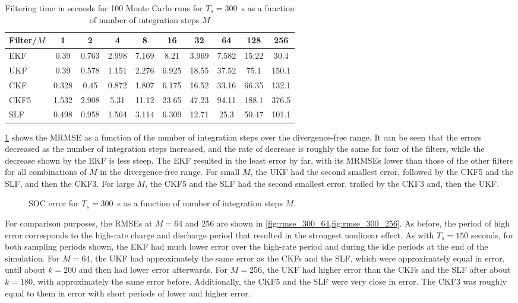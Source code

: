 \documentclass[../zhang_thesis.tex]{subfiles}
\begin{document}
\begin{table}[h]
\centering
\caption{Filtering time in seconds for 100 Monte Carlo runs for $T_s=300$~s as a function of number of integration steps $M$}
\begin{tabular}{@{}lccccccccc@{}}
\toprule
Filter/$M$ & 1     & 2     & 4     & 8     & 16    & 32    & 64    & 128   & 256   \\ \midrule
EKF        & 0.39  & 0.763 & 2.998 & 7.169 & 8.21  & 3.969 & 7.582 & 15.22 & 30.4  \\
UKF        & 0.39  & 0.578 & 1.151 & 2.276 & 6.925 & 18.55 & 37.52 & 75.1  & 150.1 \\
CKF        & 0.328 & 0.45  & 0.872 & 1.807 & 6.175 & 16.52 & 33.16 & 66.35 & 132.1 \\
CKF5       & 1.532 & 2.908 & 5.31  & 11.12 & 23.65 & 47.23 & 94.11 & 188.1 & 376.5 \\
SLF        & 0.498 & 0.958 & 1.564 & 3.114 & 6.309 & 12.71 & 25.3  & 50.47 & 101.1 \\ \bottomrule
\end{tabular}
\label{tab:time_300}
\end{table}

\cref{fig:mrmse_300} shows the MRMSE as a function of the number of integration steps over the divergence-free range. It can be seen that the errors decreased as the number of integration steps increased, and the rate of decrease is roughly the same for four of the filters, while the decrease shown by the EKF is less steep. The EKF resulted in the least error by far, with its MRMSEs lower than those of the other filters for all combinations of $M$ in the divergence-free range. For small
$M$, the UKF had the second smallest error, followed by the CKF5 and the SLF, and then the CKF3. For large $M$, the CKF5 and the SLF had the second smallest error, trailed by the CKF3 and, then the UKF.

\begin{figure}[ht]
\centering
%
\caption{SOC error for $T_s=300$~s as a function of number of integration steps $M$.}
\label{fig:mrmse_300}
\end{figure}

For comparison purposes, the RMSEs at $M=64$ and $256$ are shown in \cref{fig:rmse_300_64,fig:rmse_300_256}. As before, the period of high error corresponds to the high-rate charge and discharge period that resulted in the strongest nonlinear effect. As with $T_s=150$ seconds, for both sampling periods shown, the EKF had much lower error over the high-rate period and during the idle periods at the end of the simulation. For $M=64$, the UKF had approximately the same error as the CKFs
and the SLF, which were approximately equal in error, until about $k=200$ and then had lower error afterwards. For $M=256$, the UKF had higher error than the CKFs and the SLF after about $k=180$, with approximately the same error before. Additionally, the CKF5 and the SLF were very close in error. The CKF3 was roughly equal to them in error with short periods of lower and higher error.
\end{document}
